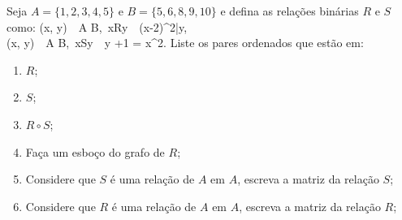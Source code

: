 \item 
 Seja $A = \{1,2,3,4,5\}$ e $B = \{5,6,8,9,10\}$ e defina as relações binárias $R$ e $S$ como:
 \ben
\forall (x, y)\ \in\ A \times B,\ xRy\ \Leftrightarrow\ (x-2)^2|y, \\
\forall (x, y)\ \in\ A \times B,\ xSy\ \Leftrightarrow\  y +1 = x^2.
\een
Liste os pares ordenados que estão em:
\begin{enumerate}
\item $R$;
\item $S$;
\item $R \circ S$;
\item Faça um esboço do grafo de $R$;
\item Considere que $S$ é uma relação de $A$ em $A$, escreva a matriz da relação $S$;
\item Considere que $R$ é uma relação de $A$ em $A$, escreva a matriz da relação $R$;
\end{enumerate}

